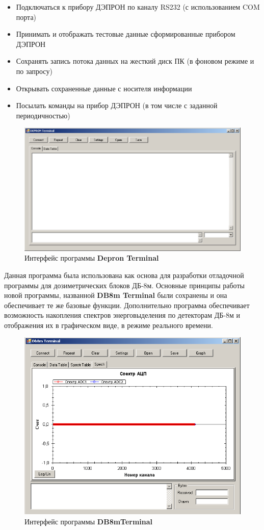 \begin{itemize}
	\item 	Подключаться к прибору ДЭПРОН по каналу RS232 (с использованием COM порта)
	
	
	\item 	Принимать и отображать тестовые данные сформированные прибором ДЭПРОН
	
	
	\item 	Сохранять запись потока данных на жесткий диск ПК (в фоновом режиме и по запросу)
	
	
	\item 	Открывать сохраненные данные с носителя информации
	
	
	\item 	Посылать команды на прибор ДЭПРОН (в том числе с заданной периодичностью)
	
	
\end{itemize}
\begin{figure}
\centering
\includegraphics[width=0.7\linewidth]{images/depron_terminal}
\caption{Интерфейс программы \textbf{Depron Terminal}}
\label{fig:depron_terminal}
\end{figure}

Данная программа была использована как основа для разработки отладочной программы для дозиметрических блоков ДБ-8м. Основные принципы работы новой программы, названной \textbf{DB8m Terminal} были сохранены и она обеспечивает те же базовые функции. Дополнительно программа обеспечивает возможность накопления спектров энерговыделения по детекторам ДБ-8м и отображения их в графическом виде, в режиме реального времени. 
\begin{figure}
\centering
\includegraphics[width=0.7\linewidth]{images/db8m_terminal}
\caption{Интерфейс программы \textbf{DB8mTerminal}}
\label{fig:db8m_terminal}
\end{figure}

